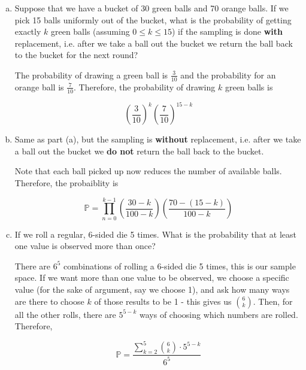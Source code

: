 \documentclass[11pt]{article}
\begin{document}
\begin{enumerate}[(a)]
\item Suppose that we have a bucket of 30 green balls and 70 orange balls. If we pick 15 balls uniformly out of the bucket, what is the probability of getting exactly $k$ green balls (assuming $0 \leq k \leq 15$) if the sampling is done {\bf with} replacement, i.e. after we take a ball out the bucket we return the ball back to the bucket for the next round?

\begin{solution}
  The probability of drawing a green ball is $\frac{3}{10}$ and the probability for an orange ball is $\frac{7}{10}$. Therefore, the probability of drawing $k$ green balls is 

  \[ \left(\frac{3}{10}\right)^k \left(\frac{7}{10}\right)^{15 - k}\]
\end{solution}
    

\item Same as part (a), but the sampling is {\bf without} replacement, i.e. after we take a ball out the bucket we {\bf do not} return the ball back to the bucket.

\begin{solution}
  Note that each ball picked up now reduces the number of available balls. Therefore, the probaiblity is 

  \[ \mathbb P = \prod_{n = 0}^{k-1} \left(\frac{30-k}{100-k}\right) \left(\frac{70 - (15 - k)}{100 - k}\right)\]
\end{solution}
    

\item If we roll a regular, 6-sided die 5 times. What is the probability that at least one value is observed more than once?

\begin{solution}
  There are $6^5$ combinations of rolling a 6-sided die 5 times, this is our sample space. If we want more than one value to be observed, we choose a specific value (for the sake of argument, say we choose 1), and ask how many ways are there to choose $k$ of those results to be 1 - this gives us ${6 \choose k}$. Then, for all the other rolls, there are $5^{5-k}$ ways of choosing which numbers are rolled. Therefore, 

  \[ \mathbb P = \frac{\sum_{k = 2}^5 {6 \choose k} \cdot 5^{5-k}}{6^5}\]
\end{solution}
    

\end{enumerate}
\end{document}
